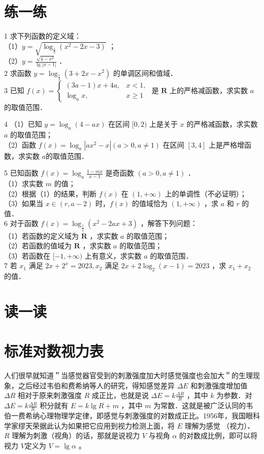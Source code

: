 \documentclass[10pt]{article}
\begin{document}
\section*{练一练}
1 求下列函数的定义域：\\
（1）\(y=\sqrt{\log _{\frac{1}{3}}\left(x^{2}-2 x-3\right)}\) ；\\
（2）\(y=\frac{\sqrt{4-x^{2}}}{\lg |x-1|}\) ．\\
2 求函数 \(y=\log _{\frac{1}{2}}\left(3+2 x-x^{2}\right)\) 的单调区间和值域．\\
3 已知 \(f(x)=\left\{\begin{array}{ll}(3 a-1) x+4 a, & x<1, \\ \log _{a} x, & x \geqslant 1\end{array}\right.\) 是 \(\mathbf{R}\) 上的严格减函数，求实数 \(a\) 的取值范围．

4 （1）已知 \(y=\log _{a}(4-a x)\) 在区间 \([0,2)\) 上是关于 \(x\) 的严格减函数，求实数 \(a\) 的取值范围；\\
（2）函数 \(f(x)=\log _{a}\left|a x^{2}-x\right|(a>0, a \neq 1)\) 在区间 \([3,4]\) 上是严格增函数，求实数 \(a\)的取值范围．

5 已知函数 \(f(x)=\log _{a} \frac{1-m x}{x-1}\) 是奇函数 \((a>0, a \neq 1)\) ．\\
（1）求实数 \(m\) 的值；\\
（2）根据（1）的结果，判断 \(f(x)\) 在 \((1,+\infty)\) 上的单调性（不必证明）；\\
（3）如果当 \(x \in(r, a-2)\) 时，\(f(x)\) 的值域恰为 \((1,+\infty)\) ，求 \(a\) 和 \(r\) 的值．\\
6 对于函数 \(f(x)=\log _{\frac{1}{2}}\left(x^{2}-2 a x+3\right)\) ，解答下列问题：\\
（1）若函数的定义域为 \(\mathbf{R}\) ，求实数 \(a\) 的取值范围；\\
（2）若函数的值域为 \(\mathbf{R}\) ，求实数 \(a\) 的取值范围；\\
（3）若函数在 \([-1,+\infty)\) 上有意义，求实数 \(a\) 的取值范围．\\
7 若 \(x_{1}\) 满足 \(2 x+2^{x}=2023, x_{2}\) 满足 \(2 x+2 \log _{2}(x-1)=2023\) ，求 \(x_{1}+x_{2}\) 的值．

\section*{读一读}
\section*{标准对数视力表}
人们很早就知道＂当感觉器官受到的刺激强度加大时感觉强度也会加大＂的生理现象，之后经过韦伯和费希纳等人的研究，得知感觉差异 \(\Delta E\) 和刺激强度增加值 \(\Delta R\) 相对于原来刺激强度 \(R\) 成正比，也就是说 \(\Delta E=k \frac{\Delta R}{R}\) ，其中 \(k\) 为参数．对 \(\Delta E=k \frac{\Delta R}{R}\) 积分就有 \(E=k \lg R+m\) ，其中 \(m\) 为常数．这就是被广泛认同的韦伯一费希纳心理物理学定律，即感觉与刺激强度的对数成正比。1956年，我国眼科学家缪天荣据此认为如果把它应用到视力检测上面，将 \(E\) 理解为感觉 （视力）、 \(R\) 理解为刺激（视角）的话，那就是说视力 \(V\) 与视角 \(\alpha\) 的对数成比例，即可以将视力 \(V\)定义为 \(V=\lg \alpha\) 。
\end{document}
